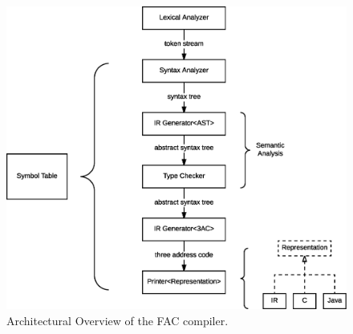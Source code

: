 \begin{figure}[H]
  \centering
  \includegraphics[width=.9\columnwidth]{img/eps/architecture.eps}
  \caption{Architectural Overview of the FAC compiler.}
  \label{fig:arch-ovw}
\end{figure}

